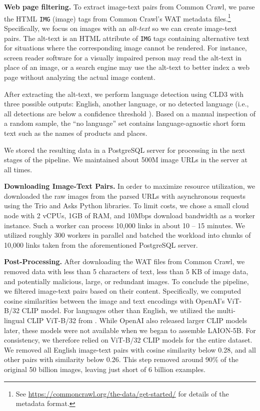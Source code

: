 \textbf{Web page filtering.} To extract image-text pairs from Common Crawl, we parse the HTML \texttt{IMG} (image) tags from Common Crawl's WAT metadata files.\footnote{See \url{https://commoncrawl.org/the-data/get-started/} for details of the metadata format.} Specifically, we focus on images with an \emph{alt-text} so we can create image-text pairs. The alt-text is an HTML attribute of \texttt{IMG} tags containing alternative text for situations where the corresponding image cannot be rendered. For instance, screen reader software for a visually impaired person may read the alt-text in place of an image, or a search engine may use the alt-text to better index a web page without analyzing the actual image content.

After extracting the alt-text, we perform language detection using CLD3 \citep{cld3} with three possible outputs: English, another language, or no detected language (i.e., all detections are below a confidence threshold \citep{schuhmann2021laion}). Based on a manual inspection of a random sample, the ``no language'' set contains language-agnostic short form text such as the names of products and places.

We stored the resulting data in a PostgreSQL server for processing in the next stages of the pipeline. We maintained about 500M image URLs in the server at all times.

\textbf{Downloading Image-Text Pairs.} In order to maximize resource utilization, we downloaded the raw images from the parsed URLs with asynchronous requests using the Trio and Asks Python libraries. To limit costs, we chose a small cloud node with 2 vCPUs, 1GB of RAM, and 10Mbps download bandwidth as a worker instance. Such a worker can process 10,000 links in about 10 -- 15 minutes. We utilized roughly 300 workers in parallel and batched the workload into chunks of 10,000 links taken from the aforementioned PostgreSQL server. 

\textbf{Post-Processing.}
After downloading the WAT files from Common Crawl, we removed data with less than 5 characters of text, less than 5 KB of image data, and potentially malicious, large, or redundant images. To conclude the pipeline, we filtered image-text pairs based on their content. Specifically, we computed cosine similarities between the image and text encodings with OpenAI's ViT-B/32 CLIP model. For languages other than English, we utilized the multi-lingual CLIP ViT-B/32 from \citet{mclip}.
While OpenAI also released larger CLIP models later, these models were not available when we began to assemble LAION-5B. For consistency, we therefore relied on ViT-B/32 CLIP models for the entire dataset. We removed all English image-text pairs with cosine similarity below 0.28, and all other pairs with similarity below 0.26. This step removed around 90\% of the original 50 billion images, leaving just short of 6 billion examples.

